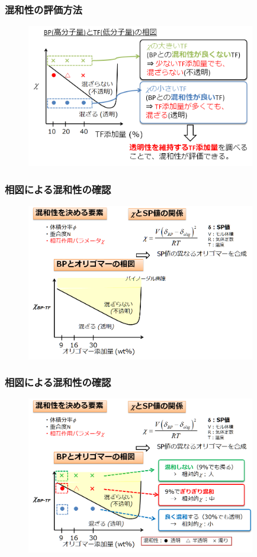 \documentclass[unicode,12pt]{beamer}%
\begin{document}
\begin{frame}\frametitle{混和性の評価方法}
	\begin{figure}
		\begin{center}
			\includegraphics[width=100mm]{kanngaekata.png}
		\end{center}
	\end{figure}
\end{frame}

%
\begin{frame}\frametitle{相図による混和性の確認}
	\begin{figure}
		\begin{center}
			\includegraphics[width=100mm]{souzu_1.png}
		\end{center}
	\end{figure}
\end{frame}

%
\begin{frame}\frametitle{相図による混和性の確認}
	\begin{figure}
		\begin{center}
			\includegraphics[width=100mm]{souzu_2.png}
		\end{center}
	\end{figure}
\end{frame}
\end{document}
